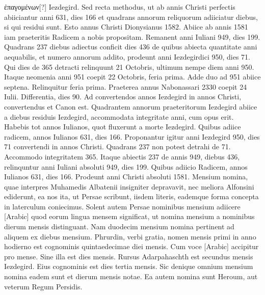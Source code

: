  \textgreek{ἐπαγομένων}[?] Iezdegird.
Sed recta
methodus, ut ab annis Christi perfectis abiiciantur anni 631, dies
166 %
 et quadrans annorum reliquorum adiiciatur diebus, si qui residui
sunt.
Esto annus Christi Dionysianus 1582.
Abiice ab annis
1581 iam praeteritis Radicem a nobis propositam.
Remanent anni
Iuliani 949, dies 199.
Quadrans 237 diebus adiectus conficit
dies 436 %
 de quibus abiecta quantitate anni aequabilis, et numero
annorum addito, prodeunt anni Iezdegirdici 950, dies 71. %
Qui
dies de 365 detracti relinquunt 21 Octobris, ultimum nempe diem
anni 950.
Itaque neomenia anni 951 coepit 22 Octobris, feria
prima.
Adde duo ad 951 %
 abiice septena.
Relinquitur feria prima.
Praeterea annus Nabonassari 2330 coepit 24 Iulii.
Differentia, dies 90.
Ad convertendos annos Iezdegird in annos Christi,
convertendus et Canon est.
Quadrantem annorum praeteritorum
Iezdegird abiice a diebus residuis Iezdegird, accommodata
integritate anni, cum opus erit.
Habebis tot annos Iulianos,
quot fluxerunt a morte Iezdegird.
Quibus adiice radicem, annos
Iulianos 631, dies 166.
Proponantur igitur anni Iezdegird 950,
dies 71 convertendi in annos Christi.
Quadrans 237 non potest
detrahi de 71.
Accommodo integritatem 365.
Itaque abiectis
237 de annis 949, diebus 436, relinquntur anni Iuliani absoluti
949, dies 199.
Quibus adiicio Radicem, annos Iulianos 631,
dies 166.
Prodeunt anni Christi absoluti 1581.
Mensium nomina,
quae interpres Muhamedis Albatenii insigniter depravavit,
nec meliora Alfonsini ediderunt, ea nos ita, ut Persae scribunt, iisdem
literis, eademque forma concepta in laterculum coniecimus.
Solent autem Persae nominibus mensium adiicere
 \textarabic{}[Arabic] quod eorum
lingua mensem significat, ut nomina mensium a nominibus
dierum mensis distinguant.
Nam duodecim mensium nomina
pertinent ad aliquem ex diebus mensium.
Phrurdin, verbi
gratia, nomen mensis primi in anno hodierno est cognominis quintaedecimae
diei mensis.
%
Cum voce \textarabic{}[Arabic] accipitur pro mense. %
Sine illa
est dies  mensis.
Rursus Adarpahaschth est secundus mensis Iezdegird.
Eius cognominis est dies tertia mensis.
Sic denique omnium
mensium nomina eadem sunt et dierum mensis notae.
Ea autem nomina
sunt Heroum, aut veterum Regum Persidis.
